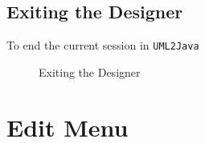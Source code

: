 \documentclass[a4paper]{article}
\begin{document}
\subsection{Exiting the Designer} 
To end the current session in \texttt{UML2Java}
\begin{figure}[H] \begin{center} 
\label{fig:exit}
\caption{Exiting the Designer}
\vspace{-20pt}
\end{center} \end{figure}

\section{Edit Menu}
\end{document}
